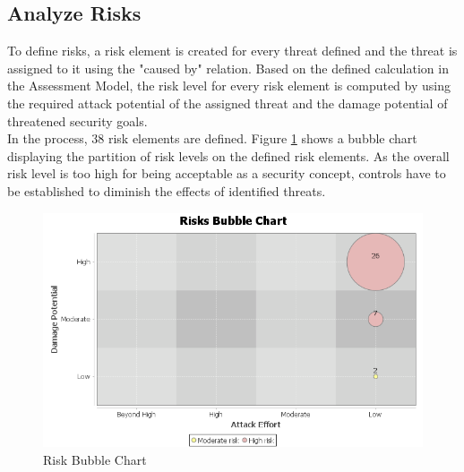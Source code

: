 \subsection{Analyze Risks}
\label{ReqAssARisks}
To define risks, a risk element is created for every threat defined and the threat is assigned to it using the "caused by" relation. Based on the defined calculation in the Assessment Model, the risk level for every risk element is computed by using the required attack potential of the assigned threat and the damage potential of threatened security goals. \\
In the process, 38 risk elements are defined. Figure \ref{fig:bubblechart} shows a bubble chart displaying the partition of risk levels on the defined risk elements. As the overall risk level is too high for being acceptable as a security concept, controls have to be established to diminish the effects of identified threats.

\begin{figure}[H]
  \includegraphics[width=\linewidth]{images/bubble_p1.png}
  \caption{Risk Bubble Chart}
  \label{fig:bubblechart}
\end{figure}


